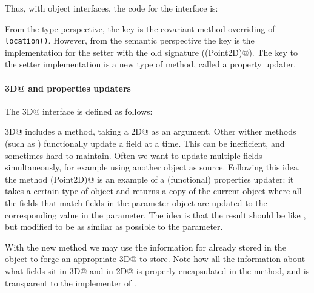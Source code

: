 Thus, with object interfaces, the code for the \Q@Bird@ interface is:




\noindent From the type perspective, the key is the covariant method
overriding of \texttt{location()}. However, from the semantic
perspective the key is the implementation for the setter with the old
signature (\Q@location(Point2D)@). The key to the setter
implementation is a new type of \Q@with@ method, called a property updater.

\paragraph{\Q@Point3D@ and properties updaters}
The \Q@Point3D@ interface is defined as follows:


\noindent \Q@Point3D@ includes a
\Q@with@ method, taking a \Q@Point2D@ as an argument.
Other wither methods (such as \Q@withX@) functionally update a field at a time.  This can be
inefficient, and sometimes hard to maintain.  Often we want to update multiple
fields simultaneously, for example using another object as source.  Following
this idea, the method \Q@with(Point2D)@ is an example of a (functional)
properties updater: it takes a certain type of object and returns a copy of the
current object where all the fields that match fields in the parameter
object are updated to the corresponding value in the parameter. The idea is that
the result should be like \Q@this@, but modified to be as similar as possible to the parameter.

With the new \Q@with@ method we may use the information for
\Q@z@ already stored in the object to forge an appropriate \Q@Point3D@
to store. Note how all the information about what fields sit in
\Q@Point3D@ and in \Q@Point2D@ is properly encapsulated in the
\Q@with@ method, and is transparent to the implementer of \Q@Bird@.

